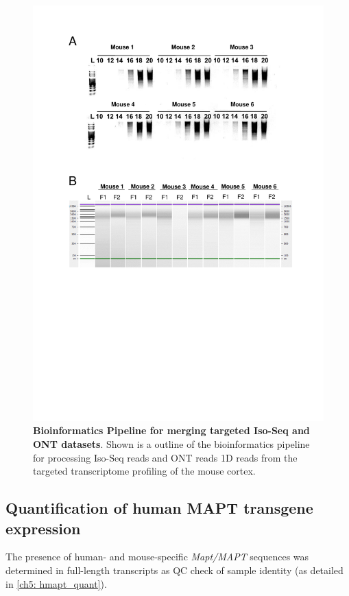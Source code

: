 \begin{figure}[htp]
	\centering
	\includegraphics[page=5,trim={0.5cm 7cm 0cm 0cm},clip,scale = 0.8]{Figures/TargetedTranscriptome_LabResults}
	\captionsetup{width=0.95\textwidth,singlelinecheck=off}
	\caption[Bioinformatics Pipeline for merging targeted Iso-Seq and ONT datasets]%
	{\textbf{Bioinformatics Pipeline for merging targeted Iso-Seq and ONT datasets}. Shown is a outline of the bioinformatics pipeline for processing Iso-Seq reads and ONT reads 1D reads from the targeted transcriptome profiling of the mouse cortex. 
	}
	\label{fig:Targeted_bioinformatics_pipeline}
\end{figure}

\subsection{Quantification of human MAPT transgene expression} 
The presence of human- and mouse-specific \textit{Mapt/MAPT} sequences was determined in full-length transcripts as QC check of sample identity (as detailed in \cref{ch5: hmapt_quant}). 

